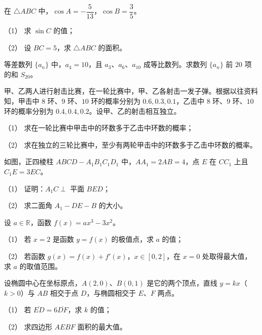 \begin{question}
在 $\triangle ABC$ 中，$\cos A=-\dfrac5{13}$，$\cos B=\dfrac35$。

（1） 求 $\sin C$ 的值；

（2） 设 $BC=5$，求 $\triangle ABC$ 的面积。

\end{question}
\begin{question}
等差数列 $\{a_n\}$ 中，$a_4=10$，且 $a_3\text{、}a_6\text{、}a_{10}$ 成等比数列。求数列 $\{a_n\}$ 前 $20$ 项的和 $S_{20}$。

\end{question}
\begin{question}
甲、乙两人进行射击比赛，在一轮比赛中，甲、乙各射击一发子弹。根据以往资料知，甲击中 $8$ 环、$9$ 环、$10$ 环的概率分别为 $0.6,0.3,0.1$，乙击中 $8$ 环、$9$ 环、$10$ 环的概率分别为 $0.4,0.4,0.2$。设甲、乙的射击相互独立。

（1） 求在一轮比赛中甲击中的环数多于乙击中环数的概率；

（2） 求在独立的三轮比赛中，至少有两轮甲击中的环数多于乙击中环数的概率。

\Needspace{0.4\textheight}
\end{question}
\begin{question}
如图，正四棱柱 $ABCD-A_1B_1C_1D_1$ 中，$AA_1=2AB=4$，点 $E$ 在 $CC_1$ 上且 $C_1E=3EC$。
\nopagebreak[4]
\begin{center}\end{center}
\nopagebreak[4]
（1） 证明：$A_1C\perp$ 平面 $BED$；

（2） 求二面角 $A_1-DE-B$ 的大小。

\end{question}
\begin{question}
设 $a\in\mathbb R$，函数 $f(x)=ax^3-3x^2$。

（1） 若 $x=2$ 是函数 $y=f(x)$ 的极值点，求 $a$ 的值；

（2） 若函数 $g(x)=f(x)+f'(x)$，$x\in[0,2]$，在 $x=0$ 处取得最大值，求 $a$ 的取值范围。

\end{question}
\begin{question}
设椭圆中心在坐标原点，$A(2,0)$、$B(0,1)$ 是它的两个顶点，直线 $y=kx$（$k>0$）与 $AB$ 相交于点 $D$，与椭圆相交于 $E\text{、}F$ 两点。

（1） 若 $\overline{ED}=6\overline{DF}$，求 $k$ 的值；

（2） 求四边形 $AEBF$ 面积的最大值。

\end{question}